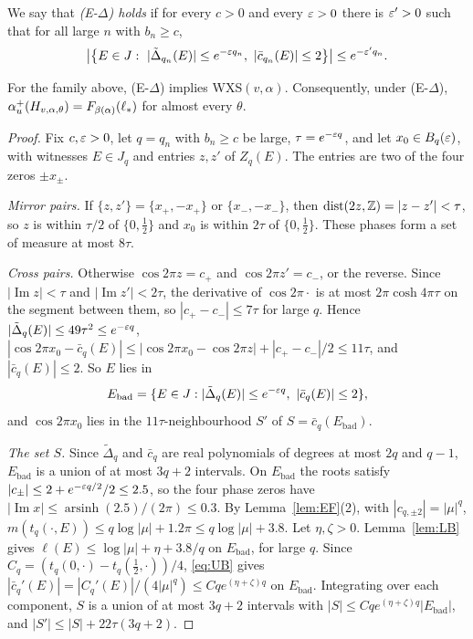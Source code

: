 \begin{definition}\label{def:EDelta}
We say that \emph{(E-$\Delta$) holds} if for every $c>0$ and every $\varepsilon>0$ there is $\varepsilon'>0$ such that for all large $n$ with $b_n\ge c$,
\[
\bigl|\bigl\{E\in J:\ |\tilde\Delta_{q_n}(E)|\le e^{-\eps q_n},\ |\bar c_{q_n}(E)|\le2\bigr\}\bigr|\le e^{-\eps'q_n}.
\]
\end{definition}

\begin{proposition}\label{prop:EDelta}
For the family above, (E-$\Delta$) implies WXS$(v,\alpha)$. Consequently, under (E-$\Delta$), $\alpha_u^+(H_{v,\alpha,\theta})=F_{\beta(\alpha)}(\ell_*)$ for almost every $\theta$.
\end{proposition}

\begin{proof}
Fix $c,\varepsilon>0$, let $q=q_n$ with $b_n\ge c$ be large, $\tau=e^{-\varepsilon q}$, and let $x_0\in B_q(\varepsilon)$, with witnesses $E\in J_q$ and entries $z,z'$ of $Z_q(E)$. The entries are two of the four zeros $\pm x_\pm$.

\emph{Mirror pairs.} If $\{z,z'\}=\{x_+,-x_+\}$ or $\{x_-,-x_-\}$, then $\operatorname{dist}(2z,\mathbb Z)=|z-z'|<\tau$, so $z$ is within $\tau/2$ of $\{0,\frac12\}$ and $x_0$ is within $2\tau$ of $\{0,\frac12\}$. These phases form a set of measure at most $8\tau$.

\emph{Cross pairs.} Otherwise $\cos2\pi z=c_+$ and $\cos2\pi z'=c_-$, or the reverse. Since $|\operatorname{Im}z|<\tau$ and $|\operatorname{Im}z'|<2\tau$, the derivative of $\cos2\pi\cdot$ is at most $2\pi\cosh4\pi\tau$ on the segment between them, so $|c_+-c_-|\le7\tau$ for large $q$. Hence $|\tilde\Delta_q(E)|\le49\tau^2\le e^{-\varepsilon q}$, $|\cos2\pi x_0-\bar c_q(E)|\le|\cos2\pi x_0-\cos2\pi z|+|c_+-c_-|/2\le11\tau$, and $|\bar c_q(E)|\le2$. So $E$ lies in
\[
E_{\mathrm{bad}}=\{E\in J:|\tilde\Delta_q(E)|\le e^{-\varepsilon q},\ |\bar c_q(E)|\le2\},
\]
and $\cos2\pi x_0$ lies in the $11\tau$-neighbourhood $S'$ of $S=\bar c_q(E_{\mathrm{bad}})$.

\emph{The set $S$.} Since $\tilde\Delta_q$ and $\bar c_q$ are real polynomials of degrees at most $2q$ and $q-1$, $E_{\mathrm{bad}}$ is a union of at most $3q+2$ intervals. On $E_{\mathrm{bad}}$ the roots satisfy $|c_\pm|\le2+e^{-\varepsilon q/2}/2\le2.5$, so the four phase zeros have $|\operatorname{Im}x|\le\operatorname{arsinh}(2.5)/(2\pi)\le0.3$. By Lemma~\ref{lem:EF}(2), with $|c_{q,\pm2}|=|\mu|^q$, $m(t_q(\cdot,E))\le q\log|\mu|+1.2\pi\le q\log|\mu|+3.8$. Let $\eta,\zeta>0$. Lemma~\ref{lem:LB} gives $\ell(E)\le\log|\mu|+\eta+3.8/q$ on $E_{\mathrm{bad}}$, for large $q$. Since $C_q=(t_q(0,\cdot)-t_q(\frac12,\cdot))/4$, \eqref{eq:UB} gives $|\bar c_q'(E)|=|C_q'(E)|/(4|\mu|^q)\le Cqe^{(\eta+\zeta)q}$ on $E_{\mathrm{bad}}$. Integrating over each component, $S$ is a union of at most $3q+2$ intervals with $|S|\le Cqe^{(\eta+\zeta)q}|E_{\mathrm{bad}}|$, and $|S'|\le|S|+22\tau(3q+2)$.


\end{proof}
